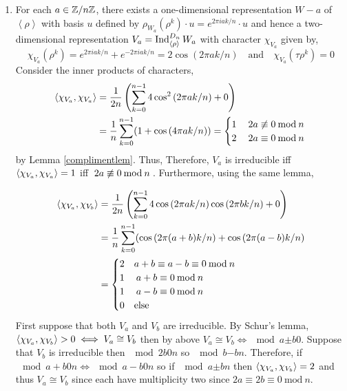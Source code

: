 \documentclass[12pt]{extarticle}
\begin{document}
\begin{enumerate}

\item For each $a \in \mathbb{Z} / n \mathbb{Z}$, there exists a one-dimensional representation $W-a$ of $\left< \rho \right>$ with basis $u$ defined by $\rho_{W_a}(\rho^k) \cdot u = e^{2 \pi i a k / n} \cdot u$ and hence a two-dimensional representation $V_a = \mathrm{Ind}^{D_n}_{\left< \rho \right>} \, W_a$ with character $\chi_{V_a}$ given by,
\[ \chi_{V_a}(\rho^k) = e^{2 \pi i a k/n} + e^{-2 \pi i a k / n} = 2 \cos{(2 \pi a k / n)} \quad \text{and} \quad \chi_{V_a}(\tau \rho^k) = 0 \]
Consider the inner products of characters,
\begin{align*}
\inner{\chi_{V_a}}{\chi_{V_a}} & = \frac{1}{2 n} \left( \sum_{k = 0}^{n - 1} 4 \cos^2{(2 \pi ak / n)} + 0 \right)
\\
& = \frac{1}{n} \sum_{k = 0}^{n - 1} (1 + \cos{(4 \pi a k / n)}) = 
\begin{cases}
1 & \nmod{2a}{0}{n} \\
2 & \mod{2a}{0}{n}
\end{cases}
\end{align*}
by Lemma \ref{complimentlem}. Thus,
Therefore, $V_a$ is irreducible iff $\left< \chi_{V_a}, \chi_{V_a} \right> = 1$ iff $\nmod{2a}{0}{n}$. Furthermore, using the same lemma,

\begin{align*}
\left< \chi_{V_a}, \chi_{V_b} \right> & = \frac{1}{2 n} \left( \sum_{k = 0}^{n - 1} 4 \cos{(2 \pi a k / n)} \cos{(2 \pi b k / n)} + 0 \right)
\\
& = \frac{1}{n} \sum_{k = 0}^{n - 1} ( \cos{(2 \pi (a + b) k / n)} + \cos{(2 \pi (a - b) k / n)}
\\
& = 
\begin{cases}
2 & a + b \equiv a - b \equiv 0 \: \mathrm{mod} \: n \\
1 & \: a + b \equiv 0 \: \mathrm{mod} \: n \: \\
1 & \: a - b \equiv 0 \: \mathrm{mod} \: n \: \\
0 & \text{else}
\end{cases}
\end{align*}
First suppose that both $V_a$ and $V_b$ are irreducible. By Schur's lemma, $\left< \chi_{V_a}, \chi_{V_b} \right> > 0 \iff V_a \cong V_b$ then by above $V_a \cong V_b \iff \mod{a}{\pm b}{0}$. Suppose that $V_b$ is irreducible then $\mod{2b}{0}{n}$ so $\mod{b}{-b}{n}$. Therefore, if $\mod{a + b}{0}{n} \iff \mod{a - b}{0}{n}$ so if $\mod{a}{\pm b}{n}$ then $\left< \chi_{V_a}, \chi_{V_b} \right> = 2$ and thus $V_a \cong V_b$ since each have multiplicity two since $2a \equiv 2b \equiv 0 \: \mathrm{mod} \: n$.  


\end{enumerate}
\end{document}
